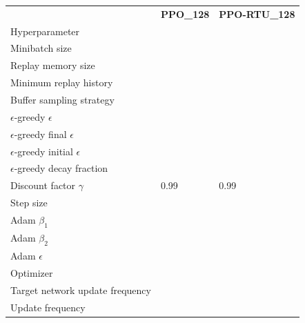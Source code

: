 \begin{tabular}{lll}
 & \bfseries PPO_128 & \bfseries PPO-RTU_128 \\
Hyperparameter &  &  \\
Minibatch size &  &  \\
Replay memory size &  &  \\
Minimum replay history &  &  \\
Buffer sampling strategy &  &  \\
$\epsilon$-greedy $\epsilon$ &  &  \\
$\epsilon$-greedy final $\epsilon$ &  &  \\
$\epsilon$-greedy initial $\epsilon$ &  &  \\
$\epsilon$-greedy decay fraction &  &  \\
Discount factor $\gamma$ & 0.99 & 0.99 \\
Step size &  &  \\
Adam $\beta_1$ &  &  \\
Adam $\beta_2$ &  &  \\
Adam $\epsilon$ &  &  \\
Optimizer &  &  \\
Target network update frequency &  &  \\
Update frequency &  &  \\
\end{tabular}
